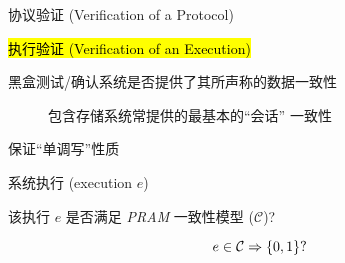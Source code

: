
\begin{frame}{}
  \begin{center}
    \vspace{0.50cm}
    协议验证 (Verification of a Protocol)

    \vspace{0.30cm}
    \hl{执行验证 (Verification of an Execution)}

    \pause
    \vspace{0.50cm}

    
    \vspace{0.30cm}
    {黑盒测试/确认系统是否提供了其所声称的数据一致性}

     
  \end{center}
\end{frame}

\begin{frame}{}
  \begin{description}
    \item[] 包含存储系统常提供的最基本的``会话''  一致性

	 
  \end{description}

  \vspace{-0.10cm}
  {\centerline{\PRAM{} 保证``单调写''性质}}
\end{frame}

\begin{frame}{}
  \begin{cdef}
    \vspace{8pt}
    \begin{description}
      \setlength{\itemsep}{8pt}
      \item[实例:] 系统执行 {\small (execution $e$)}
      \item[问题:] 该执行 $e$ 是否满足 \emph{PRAM} 一致性模型 {\small ($\mathcal{C}$)}? 
    \end{description}    

    \[
      e \in \mathcal{C} \Rightarrow \{0,1\}?
    \]
  \end{cdef}
\end{frame}

